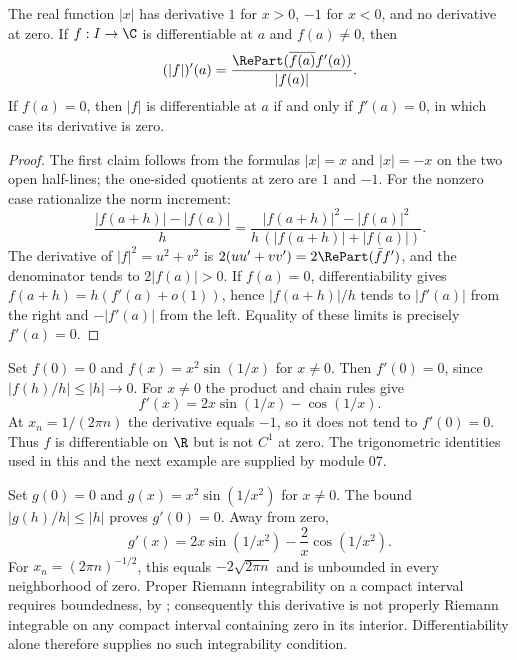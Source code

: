 \begin{proposition}
The real function $|x|$ has derivative $1$ for $x>0$, $-1$ for $x<0$, and no derivative at zero. If $f:I\to\C$ is differentiable at $a$ and $f(a)\ne0$, then
\[ (|f|)'(a)=\frac{\RePart(\overline{f(a)}f'(a))}{|f(a)|}. \]
If $f(a)=0$, then $|f|$ is differentiable at $a$ if and only if $f'(a)=0$, in which case its derivative is zero.
\end{proposition}
\begin{proof}
The first claim follows from the formulas $|x|=x$ and $|x|=-x$ on the two open half-lines; the one-sided quotients at zero are $1$ and $-1$. For the nonzero case rationalize the norm increment:
\[ \frac{|f(a+h)|-|f(a)|}{h}=\frac{|f(a+h)|^2-|f(a)|^2}{h\,(|f(a+h)|+|f(a)|)}. \]
The derivative of $|f|^2=u^2+v^2$ is $2(uu'+vv')=2\RePart(\bar f f')$, and the denominator tends to $2|f(a)|>0$. If $f(a)=0$, differentiability gives $f(a+h)=h(f'(a)+o(1))$, hence $|f(a+h)|/h$ tends to $|f'(a)|$ from the right and $-|f'(a)|$ from the left. Equality of these limits is precisely $f'(a)=0$.
\end{proof}

\begin{example}
Set $f(0)=0$ and $f(x)=x^2\sin(1/x)$ for $x\ne0$. Then $f'(0)=0$, since $|f(h)/h|\le|h|\to0$. For $x\ne0$ the product and chain rules give
\[ f'(x)=2x\sin(1/x)-\cos(1/x). \]
At $x_n=1/(2\pi n)$ the derivative equals $-1$, so it does not tend to $f'(0)=0$. Thus $f$ is differentiable on $\R$ but is not $C^1$ at zero. The trigonometric identities used in this and the next example are supplied by module 07.
\end{example}

\begin{example}
Set $g(0)=0$ and $g(x)=x^2\sin(1/x^2)$ for $x\ne0$. The bound $|g(h)/h|\le|h|$ proves $g'(0)=0$. Away from zero,
\[ g'(x)=2x\sin(1/x^2)-\frac2x\cos(1/x^2). \]
For $x_n=(2\pi n)^{-1/2}$, this equals $-2\sqrt{2\pi n}$ and is unbounded in every neighborhood of zero. Proper Riemann integrability on a compact interval requires boundedness, by ; consequently this derivative is not properly Riemann integrable on any compact interval containing zero in its interior. Differentiability alone therefore supplies no such integrability condition.
\end{example}

